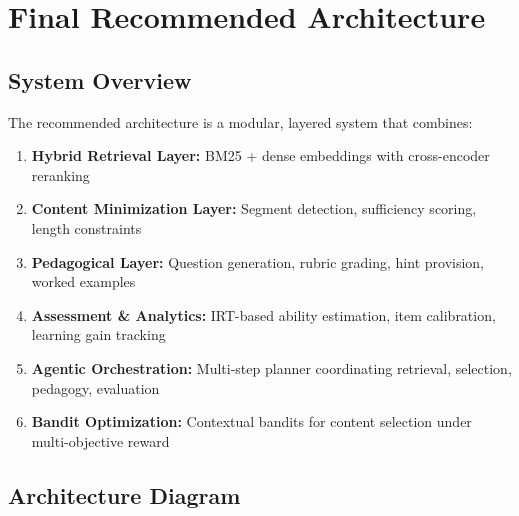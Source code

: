 \documentclass[11pt,letterpaper]{article}
\begin{document}
\newpage

\section{Final Recommended Architecture}\label{sec:final-architecture}

\subsection{System Overview}\label{subsec:system-overview}

The recommended architecture is a modular, layered system that combines:
\begin{enumerate}
\item \textbf{Hybrid Retrieval Layer:} BM25 + dense embeddings with cross-encoder reranking
\item \textbf{Content Minimization Layer:} Segment detection, sufficiency scoring, length constraints
\item \textbf{Pedagogical Layer:} Question generation, rubric grading, hint provision, worked examples
\item \textbf{Assessment \& Analytics:} IRT-based ability estimation, item calibration, learning gain tracking
\item \textbf{Agentic Orchestration:} Multi-step planner coordinating retrieval, selection, pedagogy, evaluation
\item \textbf{Bandit Optimization:} Contextual bandits for content selection under multi-objective reward
\end{enumerate}

\subsection{Architecture Diagram}\label{subsec:architecture-diagram}
\end{document}
